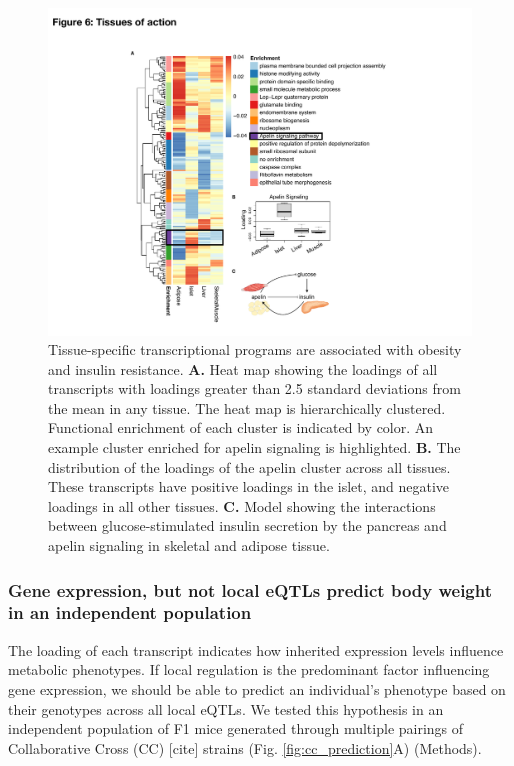 \documentclass[
]{article}
\begin{document}
\begin{figure}[ht!]
\includegraphics[width=5in]{Figures/Fig6_TOA.pdf} 
\caption{Tissue-specific transcriptional programs are associated 
with obesity and insulin resistance. \textbf{A.} Heat map showing 
the loadings of all transcripts with loadings greater than 2.5 standard 
deviations from the mean in any tissue. The heat map is hierarchically 
clustered. Functional enrichment of each cluster is indicated by color. 
An example cluster enriched for apelin signaling is highlighted. \textbf{B.} 
The distribution of the loadings of the apelin cluster across all tissues. 
These transcripts have positive loadings in the islet, and negative 
loadings in all other tissues. \textbf{C.} Model showing the interactions 
between glucose-stimulated insulin secretion by the pancreas and apelin 
signaling in skeletal and adipose tissue.
}
\label{fig:toa}
\end{figure}

\subsubsection{Gene expression, but not local eQTLs predict body weight
in an independent
population}\label{gene-expression-but-not-local-eqtls-predict-body-weight-in-an-independent-population}

The loading of each transcript indicates how inherited expression levels
influence metabolic phenotypes. If local regulation is the predominant
factor influencing gene expression, we should be able to predict an
individual's phenotype based on their genotypes across all local eQTLs.
We tested this hypothesis in an independent population of F1 mice
generated through multiple pairings of Collaborative Cross (CC)
{[}cite{]} strains (Fig. \ref{fig:cc_prediction}A) (Methods).
\end{document}
